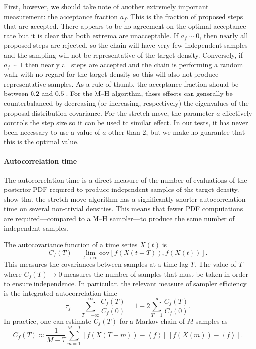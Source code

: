 \documentclass[12pt,preprint]{aastex}
\newcommand{\sectlabel}[1]{\label{sect:#1}}
\renewcommand{\vector}[1]{#1}
\newcommand{\af}{\ensuremath{a_f}}
\newcommand{\expect}[1]{\left<#1\right>}
\begin{document}
First,
however, we should take note of another extremely important measurement:
the acceptance fraction \af. This is the fraction of proposed steps that are
accepted. There appears to be no agreement on the optimal acceptance rate
but it is clear that both extrema are unacceptable. If $\af \sim 0$, then
nearly all proposed steps are rejected, so
the chain will have very few independent samples and the sampling will not be
representative of the target density. Conversely, if $\af \sim 1$ then nearly
all steps are accepted and the
chain is performing a random walk with no regard for the target density so
this will also not produce representative samples. As a rule of thumb, the
acceptance fraction should be between $0.2$ and $0.5$
\citep[for example,][]{Gelman:1996}. For the M--H algorithm,
these effects can generally be counterbalanced by decreasing (or increasing,
respectively) the eigenvalues of the proposal distribution covariance. For
the stretch move, the parameter $a$ effectively controls the step size so
it can be used to similar effect. In our tests, it has never been
necessary to use a value of $a$ other than $2$, but we make no guarantee that
this is the optimal value.

\paragraph{Autocorrelation time} \sectlabel{acor}

The autocorrelation time is a direct measure of the number of evaluations of
the posterior PDF required to produce independent samples of the target
density.  show that the stretch-move algorithm
has a significantly shorter autocorrelation time on several non-trivial
densities. This means that fewer PDF computations are required---compared
to a M--H sampler---to produce the same number of independent samples.

The autocovariance function of a time series $\vector{X} (t)$ is
\begin{equation}
    C_f (T) = \lim_{t \to \infty} \mathrm{cov}
        \left [ f\left (\vector{X}(t+T) \right ),
            f\left (\vector{X}(t) \right ) \right ].
\end{equation}
This measures the covariances between samples at a time lag $T$. The
value of $T$ where $C_f(T) \to 0$ measures the number of samples that
must be taken in order to ensure independence. In particular, the
relevant measure of sampler efficiency is the integrated autocorrelation
time
\begin{equation}
    \tau_f = \sum_{T=-\infty} ^{\infty} \frac{C_f(T)}{C_f(0)}
        = 1+2\sum_{T=1} ^{\infty} \frac{C_f(T)}{C_f(0)}.
\end{equation}
In practice, one can estimate $C_f (T)$ for a Markov chain of $M$ samples as
\begin{equation}
    C_f (T) \approx \frac{1}{M-T} \sum_{m=1}^{M-T}
        \left [ f(X(T+m)) - \expect{f} \right ] \,
        \left [ f(X(m)) - \expect{f} \right ].
\end{equation}
\end{document}
